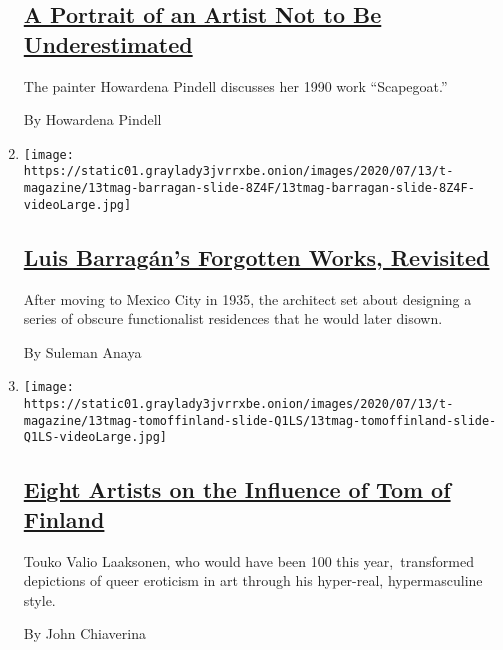 \begin{enumerate}
  \hypertarget{a-portrait-of-an-artist-not-to-be-underestimated}{%
  \subsection{\texorpdfstring{\href{/2020/07/24/t-magazine/howardena-pindell.html}{A
  Portrait of an Artist Not to Be
  Underestimated}}{A Portrait of an Artist Not to Be Underestimated}}\label{a-portrait-of-an-artist-not-to-be-underestimated}}

  The painter Howardena Pindell discusses her 1990 work ``Scapegoat.''

  By Howardena Pindell
\item
  \texttt{[image: https://static01.graylady3jvrrxbe.onion/images/2020/07/13/t-magazine/13tmag-barragan-slide-8Z4F/13tmag-barragan-slide-8Z4F-videoLarge.jpg]}

  \hypertarget{luis-barraguxe1ns-forgotten-works-revisited}{%
  \subsection{\texorpdfstring{\href{/2020/07/24/t-magazine/luis-barragan.html}{Luis
  Barragán's Forgotten Works,
  Revisited}}{Luis Barragán's Forgotten Works, Revisited}}\label{luis-barraguxe1ns-forgotten-works-revisited}}

  After moving to Mexico City in 1935, the architect set about designing
  a series of obscure functionalist residences that he would later
  disown.

  By Suleman Anaya
\item
  \texttt{[image: https://static01.graylady3jvrrxbe.onion/images/2020/07/13/t-magazine/13tmag-tomoffinland-slide-Q1LS/13tmag-tomoffinland-slide-Q1LS-videoLarge.jpg]}

  \hypertarget{eight-artists-on-the-influence-of-tom-of-finland}{%
  \subsection{\texorpdfstring{\href{/2020/07/23/t-magazine/tom-of-finland.html}{Eight
  Artists on the Influence of Tom of
  Finland}}{Eight Artists on the Influence of Tom of Finland}}\label{eight-artists-on-the-influence-of-tom-of-finland}}

  Touko Valio Laaksonen, who would have been 100 this year,~transformed
  depictions of queer eroticism in art through his hyper-real,
  hypermasculine style.

  By John Chiaverina
\end{enumerate}

